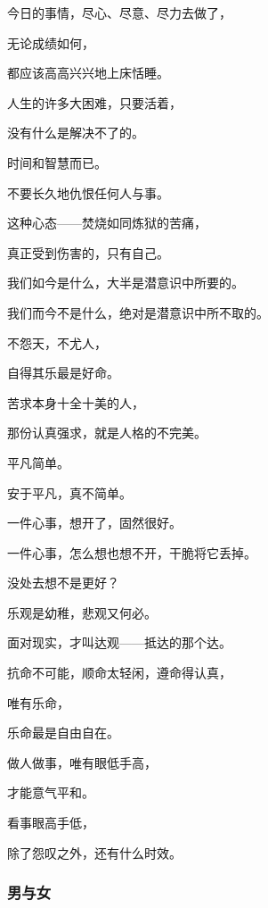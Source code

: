 \par 今日的事情，尽心、尽意、尽力去做了，
\par 无论成绩如何，
\par 都应该高高兴兴地上床恬睡。
\par 
\par 人生的许多大困难，只要活着，
\par 没有什么是解决不了的。
\par 时间和智慧而已。
\par 
\par 不要长久地仇恨任何人与事。
\par 这种心态——焚烧如同炼狱的苦痛，
\par 真正受到伤害的，只有自己。
\par 
\par 我们如今是什么，大半是潜意识中所要的。
\par 我们而今不是什么，绝对是潜意识中所不取的。
\par 不怨天，不尤人，
\par 自得其乐最是好命。
\par 
\par 苦求本身十全十美的人，
\par 那份认真强求，就是人格的不完美。
\par 
\par 平凡简单。
\par 安于平凡，真不简单。
\par 
\par 一件心事，想开了，固然很好。
\par 一件心事，怎么想也想不开，干脆将它丢掉。
\par 没处去想不是更好？
\par 
\par 乐观是幼稚，悲观又何必。
\par 面对现实，才叫达观——抵达的那个达。
\par 
\par 抗命不可能，顺命太轻闲，遵命得认真，
\par 唯有乐命，
\par 乐命最是自由自在。
\par 
\par 做人做事，唯有眼低手高，
\par 才能意气平和。
\par 看事眼高手低，
\par 除了怨叹之外，还有什么时效。



\subsubsection{男与女}


